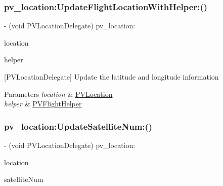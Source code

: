\subsubsection{\texorpdfstring{pv\+\_\+location\+:\+Update\+Flight\+Location\+With\+Helper\+:()}{pv\_location:UpdateFlightLocationWithHelper:()}}
{\footnotesize\ttfamily -\/ (void P\+V\+Location\+Delegate) pv\+\_\+location\+: \begin{DoxyParamCaption}\item[{(\hyperlink{interface_p_v_location}{P\+V\+Location} $\ast$)}]{location }\item[{UpdateFlightLocationWithHelper:(\hyperlink{interface_p_v_flight_helper}{P\+V\+Flight\+Helper} $\ast$)}]{helper }\end{DoxyParamCaption}\hspace{0.3cm}{\ttfamily [optional]}}

\mbox{[}P\+V\+Location\+Delegate\mbox{]} Update the latitude and longitude information


\begin{DoxyParams}{Parameters}
{\em location} & \hyperlink{interface_p_v_location}{P\+V\+Location} \\
\hline
{\em helper} & \hyperlink{interface_p_v_flight_helper}{P\+V\+Flight\+Helper} \\
\hline
\end{DoxyParams}
\mbox{\label{protocol_p_v_location_delegate_01-p_adc27ec7d1a4ddad3f7b98415549359b2}} 
\subsubsection{\texorpdfstring{pv\+\_\+location\+:\+Update\+Satellite\+Num\+:()}{pv\_location:UpdateSatelliteNum:()}}
{\footnotesize\ttfamily -\/ (void P\+V\+Location\+Delegate) pv\+\_\+location\+: \begin{DoxyParamCaption}\item[{(\hyperlink{interface_p_v_location}{P\+V\+Location} $\ast$)}]{location }\item[{UpdateSatelliteNum:(int)}]{satellite\+Num }\end{DoxyParamCaption}\hspace{0.3cm}{\ttfamily [optional]}}

